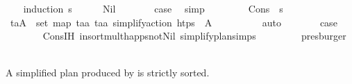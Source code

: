 \begin{isabellebody}
%
\isadelimproof
\ \ %
\endisadelimproof
%
\isatagproof
{}\isamarkupfalse%
\ {\isacharparenleft}{\kern0pt}induction\ {\isasympi}s{\isacharparenright}{\kern0pt}\isanewline
\ \ \ \ \isamarkupfalse%
\ Nil\isanewline
\ \ \ \ \isamarkupfalse%
\ \isamarkupfalse%
\ {\isacharquery}{\kern0pt}case\ \isamarkupfalse%
\ simp\isanewline
\ \ \isamarkupfalse%
\isanewline
\ \ \ \ \isamarkupfalse%
\ {\isacharparenleft}{\kern0pt}Cons\ {\isasympi}\ {\isasympi}s{\isacharparenright}{\kern0pt}\ \isanewline
\ \ \ \ \isamarkupfalse%
\ {\isachardoublequoteopen}{\isasymforall}{\isacharparenleft}{\kern0pt}t\isactrlsub a{\isacharcomma}{\kern0pt}A{\isacharparenright}{\kern0pt}\ {\isasymin}\ set\ {\isacharparenleft}{\kern0pt}map\ {\isacharparenleft}{\kern0pt}{\isasymlambda}{\isacharparenleft}{\kern0pt}t\isactrlsub a{\isacharcomma}{\kern0pt}a{\isacharparenright}{\kern0pt}{\isachardot}{\kern0pt}\ {\isacharparenleft}{\kern0pt}t\isactrlsub a{\isacharcomma}{\kern0pt}{\isacharbrackleft}{\kern0pt}a{\isacharbrackright}{\kern0pt}{\isacharparenright}{\kern0pt}{\isacharparenright}{\kern0pt}\ {\isacharparenleft}{\kern0pt}simplify{\isacharunderscore}{\kern0pt}action\ htps\ {\isasympi}{\isacharparenright}{\kern0pt}{\isacharparenright}{\kern0pt}{\isachardot}{\kern0pt}\ A\ {\isasymnoteq}\ {\isacharbrackleft}{\kern0pt}{\isacharbrackright}{\kern0pt}{\isachardoublequoteclose}\isanewline
\ \ \ \ \ \ \isamarkupfalse%
\ auto\isanewline
\ \ \ \ \isamarkupfalse%
\ \isamarkupfalse%
\ {\isacharquery}{\kern0pt}case\ \isanewline
\ \ \ \ \ \ \isamarkupfalse%
\ {\isachardoublequoteopen}Cons{\isachardot}{\kern0pt}IH{\isachardoublequoteclose}\ insort{\isacharunderscore}{\kern0pt}mult{\isacharunderscore}{\kern0pt}happs{\isacharunderscore}{\kern0pt}not{\isacharunderscore}{\kern0pt}Nil\ simplify{\isacharunderscore}{\kern0pt}plan{\isachardot}{\kern0pt}simps{\isacharparenleft}{\kern0pt}{}{\isacharparenright}{\kern0pt}\ \isanewline
\ \ \ \ \ \ \isamarkupfalse%
\ presburger\isanewline
\ \ \isamarkupfalse%
%
\endisatagproof
{\isafoldproof}%
%
\isadelimproof
%
\endisadelimproof
%
\begin{isamarkuptext}%
A simplified plan produced by  is strictly sorted.%
\end{isamarkuptext}\isamarkuptrue%
\ \ \isamarkupfalse%

\end{isabellebody}
